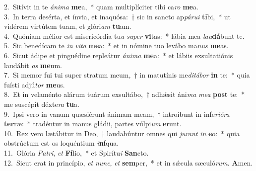 {2.~}Sitívit in te \textit{á}\textit{ni}\textit{ma} \textbf{me}a,~* quam multiplíciter tibi ca\textit{ro} \textbf{me}a.\\
{3.~}In terra desérta, et ínvia, et inaquósa:~† sic in sancto ap\textit{pá}\textit{ru}\textit{i} \textbf{ti}bi,~* ut vidérem virtútem tuam, et glóri\textit{am} \textbf{tu}am.\\
{4.~}Quóniam mélior est misericórdia tu\textit{a} \textit{su}\textit{per} \textbf{vi}tas:~* lábia mea \textit{lau}\textbf{dá}bunt te.\\
{5.~}Sic benedícam te \textit{in} \textit{vi}\textit{ta} \textbf{me}a:~* et in nómine tuo levábo ma\textit{nus} \textbf{me}as.\\
{6.~}Sicut ádipe et pinguédine repleátur \textit{á}\textit{ni}\textit{ma} \textbf{me}a:~* et lábiis exsultatiónis laudábit \textit{os} \textbf{me}um.\\
{7.~}Si memor fui tui super stratum meum,~† in matutínis me\textit{di}\textit{tá}\textit{bor} \textbf{in} te:~* quia fuísti adjú\textit{tor} \textbf{me}us.\\
{8.~}Et in velaménto alárum tuárum exsultábo,~† adhǽsit áni\textit{ma} \textit{me}\textit{a} \textbf{post} te:~* me suscépit déxte\textit{ra} \textbf{tu}a.\\
{9.~}Ipsi vero in vanum quæsiérunt ánimam meam,~† introíbunt in infe\textit{ri}\textit{ó}\textit{ra} \textbf{ter}ræ:~* tradéntur in manus gládii, partes vúlpi\textit{um} \textbf{e}runt.\\
{10.~}Rex vero lætábitur in Deo,~† laudabúntur omnes qui \textit{ju}\textit{rant} \textit{in} \textbf{e}o:~* quia obstrúctum est os loquéntium \textit{i}\textbf{ní}qua.\\
{11.~}Glória \textit{Pa}\textit{tri}, \textit{et} \textbf{Fí}lio,~* et Spirítu\textit{i} \textbf{San}cto.\\
{12.~}Sicut erat in princípio, \textit{et} \textit{nunc}, \textit{et} \textbf{sem}per,~* et in sǽcula sæculó\textit{rum}. \textbf{A}men.\\
